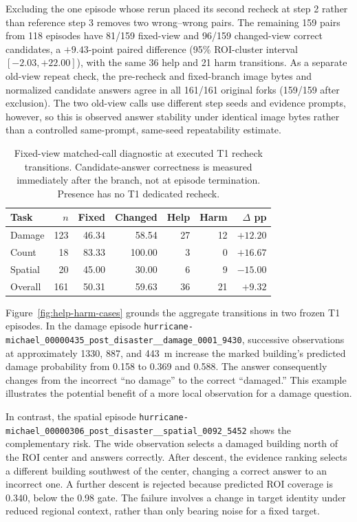 Excluding the one episode whose rerun placed its second recheck at step 2 rather than reference step 3 removes two wrong--wrong pairs. The remaining 159 pairs from 118 episodes have 81/159 fixed-view and 96/159 changed-view correct candidates, a $+9.43$-point paired difference (95\% ROI-cluster interval $[-2.03,+22.00]$), with the same 36 help and 21 harm transitions. As a separate old-view repeat check, the pre-recheck and fixed-branch image bytes and normalized candidate answers agree in all 161/161 original forks (159/159 after exclusion). The two old-view calls use different step seeds and evidence prompts, however, so this is observed answer stability under identical image bytes rather than a controlled same-prompt, same-seed repeatability estimate.

\begin{table}[htbp]
\centering\small
\caption{Fixed-view matched-call diagnostic at executed T1 recheck transitions. Candidate-answer correctness is measured immediately after the branch, not at episode termination. Presence has no T1 dedicated recheck.}
\label{tab:matched-view}
\begin{tabular}{lrrrrrr}
\toprule
Task & $n$ & Fixed & Changed & Help & Harm & $\Delta$ pp\\
\midrule
Damage & 123 & 46.34 & 58.54 & 27 & 12 & $+12.20$\\
Count & 18 & 83.33 & 100.00 & 3 & 0 & $+16.67$\\
Spatial & 20 & 45.00 & 30.00 & 6 & 9 & $-15.00$\\
\midrule
Overall & 161 & 50.31 & 59.63 & 36 & 21 & $+9.32$\\
\bottomrule
\end{tabular}
\end{table}

Figure~\ref{fig:help-harm-cases} grounds the aggregate transitions in two frozen T1 episodes. In the damage episode \nolinkurl{hurricane-michael_00000435_post_disaster__damage_0001_9430}, successive observations at approximately 1330, 887, and 443~m increase the marked building's predicted damage probability from 0.158 to 0.369 and 0.588. The answer consequently changes from the incorrect ``no damage'' to the correct ``damaged.'' This example illustrates the potential benefit of a more local observation for a damage question.

In contrast, the spatial episode \nolinkurl{hurricane-michael_00000306_post_disaster__spatial_0092_5452} shows the complementary risk. The wide observation selects a damaged building north of the ROI center and answers correctly. After descent, the evidence ranking selects a different building southwest of the center, changing a correct answer to an incorrect one. A further descent is rejected because predicted ROI coverage is 0.340, below the 0.98 gate. The failure involves a change in target identity under reduced regional context, rather than only bearing noise for a fixed target.

